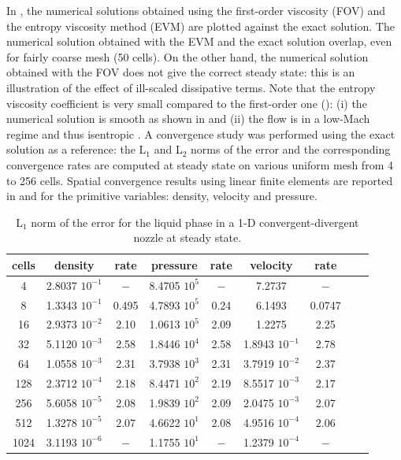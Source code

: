 %
In , the numerical solutions obtained using the first-order viscosity (FOV) and the entropy viscosity method (EVM) are plotted against the exact solution. The numerical solution obtained with the EVM and the exact solution overlap, even for fairly coarse mesh (50 cells).
On the other hand, the numerical solution obtained with the FOV does not give the correct steady state: this is an illustration of the effect of ill-scaled dissipative terms. 
%
Note that the entropy viscosity coefficient is very small compared to the first-order one (): (i) the numerical solution is smooth as shown in  and (ii) the flow is in a low-Mach regime and thus isentropic . A convergence study was performed using the exact solution as a reference: the L$_1$ and L$_2$ norms of the error and the corresponding convergence rates are computed at steady state on various uniform mesh from 4 to 256 cells.
Spatial convergence results using linear finite elements are reported in  and  for the primitive variables: density, velocity and pressure.
%
\begin{table}[H]
\begin{center}
 \caption{\label{tbl:l1_norm_liq} L$_1$ norm of the error for the liquid phase in a 1-D convergent-divergent nozzle at steady state.}
 \begin{tabular}{|c|c|c|c|c|c|c|c|c|}
 \hline
cells & density         & rate   & pressure        & rate    & velocity         & rate     \\ \hline
4    & 2.8037 $10^{-1}$ & $-$    & 8.4705 $10^{5}$ & $-$     & 7.2737           & $-$      \\ \hline
8    & 1.3343 $10^{-1}$ & 0.495 & 4.7893 $10^{5}$ & 0.24 & 6.1493           & 0.0747 \\ \hline
16   & 2.9373 $10^{-2}$ & 2.10 & 1.0613 $10^{5}$ & 2.09  & 1.2275           & 2.25   \\ \hline
32   & 5.1120 $10^{-3}$ & 2.58 & 1.8446 $10^{4}$ & 2.58  & 1.8943 $10^{-1}$ & 2.78   \\ \hline
64   & 1.0558 $10^{-3}$ & 2.31 & 3.7938 $10^{3}$ & 2.31  & 3.7919 $10^{-2}$ & 2.37   \\ \hline
128  & 2.3712 $10^{-4}$ & 2.18 & 8.4471 $10^{2}$ & 2.19  & 8.5517 $10^{-3}$ & 2.17   \\ \hline
256  & 5.6058 $10^{-5}$ & 2.08 & 1.9839 $10^{2}$ & 2.09  & 2.0475 $10^{-3}$ & 2.07   \\ \hline
512  & 1.3278 $10^{-5}$ & $2.07$ & 4.6622 $10^{1}$ & 2.08  & 4.9516 $10^{-4}$ & $2.06$   \\ \hline
1024  & 3.1193 $10^{-6}$ & $-$ & 1.1755 $10^{1}$ & $-$  & 1.2379 $10^{-4}$ & $-$   \\ \hline
\end{tabular}
\end{center}
\end{table}
